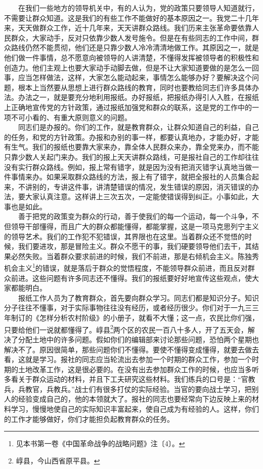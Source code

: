 \documentclass[cn,11pt,chinese]{elegantbook}
\begin{document}
　　在我们一些地方的领导机关中，有的人认为，党的政策只要领导人知道就行，不需要让群众知道。这是我们的有些工作不能做好的基本原因之一。我党二十几年来，天天做群众工作，近十几年来，天天讲群众路线。我们历来主张革命要依靠人民群众，大家动手，反对只依靠少数人发号施令。但是在有些同志的工作中间，群众路线仍然不能贯彻，他们还是只靠少数人冷冷清清地做工作。其原因之一，就是他们做一件事情，总不愿意向被领导的人讲清楚，不懂得发挥被领导者的积极性和创造力。他们主观上也要大家动手动脚去做，但是不让大家知道要做的是怎么一回事，应当怎样做法，这样，大家怎么能动起来，事情怎么能够办好？要解决这个问题，根本上当然要从思想上进行群众路线的教育，同时也要教给同志们许多具体办法。办法之一，就是要充分地利用报纸。办好报纸，把报纸办得引人入胜，在报纸上正确地宣传党的方针政策，通过报纸加强党和群众的联系，这是党的工作中的一项不可小看的、有重大原则意义的问题。\\
　　同志们是办报的。你们的工作，就是教育群众，让群众知道自己的利益，自己的任务，和党的方针政策。办报和办别的事一样，都要认真地办，才能办好，才能有生气。我们的报纸也要靠大家来办，靠全体人民群众来办，靠全党来办，而不能只靠少数人关起门来办。我们的报上天天讲群众路线，可是报社自己的工作却往往没有实行群众路线。例如，报上常有错字，就是因为没有把消灭错字认真地当做一件事情来办。如果采取群众路线的方法，报上有了错字，就把全报社的人员集合起来，不讲别的，专讲这件事，讲清楚错误的情况，发生错误的原因，消灭错误的办法，要大家认真注意。这样讲上三次五次，一定能使错误得到纠正。小事如此，大事也是如此。\\
　　善于把党的政策变为群众的行动，善于使我们的每一个运动，每一个斗争，不但领导干部懂得，而且广大的群众都能懂得，都能掌握，这是一项马克思列宁主义的领导艺术。我们的工作犯不犯错误，其界限也在这里。当着群众还不觉悟的时候，我们要进攻，那是冒险主义。群众不愿干的事，我们硬要领导他们去干，其结果必然失败。当着群众要求前进的时候，我们不前进，那是右倾机会主义。陈独秀机会主义\footnote[1]{ 见本书第一卷《中国革命战争的战略问题》注〔4〕。}的错误，就是落后于群众的觉悟程度，不能领导群众前进，而且反对群众前进。这些问题有许多同志还不懂得。我们的报纸要好好地宣传这些观点，使大家都能明白。\\
　　报纸工作人员为了教育群众，首先要向群众学习。同志们都是知识分子。知识分子往往不懂事，对于实际事物往往没有经历，或者经历很少。你们对于一九三三年制订的《怎样分析农村阶级》的小册子，就看不大懂；这一点，农民比你们强，只要给他们一说就都懂得了。崞县\footnote[2]{ 崞县，今山西省原平县。}两个区的农民一百八十多人，开了五天会，解决了分配土地中的许多问题。假如你们的编辑部来讨论那些问题，恐怕两个星期也解决不了。原因很简单，那些问题你们不懂得。要使不懂得变成懂得，就要去做去看，这就是学习。报社的同志应当轮流出去参加一个时期的群众工作，参加一个时期的土地改革工作，这是很必要的。在没有出去参加群众工作的时候，也应当多听多看关于群众运动的材料，并且下工夫研究这些材料。我们练兵的口号是：“官教兵，兵教官，兵教兵。”战士们有很多打仗的实际经验。当官的要向战士学习，把别人的经验变成自己的，他的本领就大了。报社的同志也要经常向下边反映上来的材料学习，慢慢地使自己的实际知识丰富起来，使自己成为有经验的人。这样，你们的工作才能够做好，你们才能担负起教育群众的任务。\\
\end{document}
